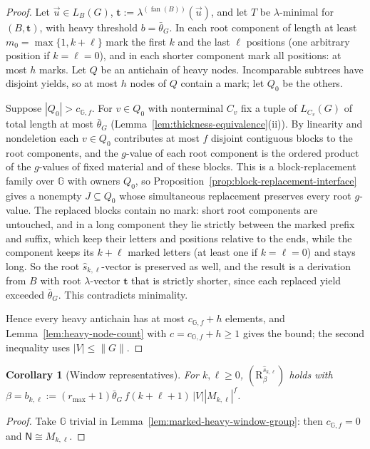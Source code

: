 \documentclass[11pt]{article}
\numberwithin{equation}{section}
\theoremstyle{plain}
\newtheorem{corollary}[theorem]{Corollary}
\theoremstyle{definition}
\theoremstyle{remark}
\newcommand{\tuple}[1]{\vec{#1}}
\newcommand{\fan}{\operatorname{fan}}
\begin{document}
\begin{proof}
Let $\tuple u\in L_B(G)$, $\mathbf t:=\lambda^{(\fan(B))}(\tuple u)$, and let $T$ be
$\lambda$-minimal for $(B,\mathbf t)$, with heavy threshold $b=\bar\theta_G$.  In
each root component of length at least $m_0=\max\{1,k+\ell\}$ mark the first $k$
and the last $\ell$ positions (one arbitrary position if $k=\ell=0$), and in each
shorter component mark all positions: at most $h$ marks.  Let $Q$ be an antichain
of heavy nodes.  Incomparable subtrees have disjoint yields, so at most $h$ nodes
of $Q$ contain a mark; let $Q_0$ be the others.

Suppose $|Q_0|>c_{{\mathbb G},f}$.  For $v\in Q_0$ with nonterminal $C_v$ fix a tuple of
$L_{C_v}(G)$ of total length at most $\bar\theta_G$
(Lemma~\ref{lem:thickness-equivalence}(ii)).  By linearity and nondeletion each
$v\in Q_0$ contributes at most $f$ disjoint contiguous blocks to the root
components, and the $g$-value of each root component is the ordered product of
the $g$-values of fixed material and of these blocks.  This is a
block-replacement family over ${\mathbb G}$ with owners $Q_0$, so
Proposition~\ref{prop:block-replacement-interface} gives a nonempty
$J\subseteq Q_0$ whose simultaneous replacement preserves every root $g$-value.
The replaced blocks contain no mark: short root components are untouched, and in
a long component they lie strictly between the marked prefix and suffix, which
keep their letters and positions relative to the ends, while the component keeps
its $k+\ell$ marked letters (at least one if $k=\ell=0$) and stays long.  So the
root $\widehat s_{k,\ell}$-vector is preserved as well, and the result is a derivation
from $B$ with root $\lambda$-vector $\mathbf t$ that is strictly shorter, since each
replaced yield exceeded $\bar\theta_G$.  This contradicts minimality.

Hence every heavy antichain has at most $c_{{\mathbb G},f}+h$ elements, and
Lemma~\ref{lem:heavy-node-count} with $c=c_{{\mathbb G},f}+h\ge1$ gives the bound; the
second inequality uses $|V|\le\|G\|$.
\end{proof}

\begin{corollary}[Window representatives]
\label{lem:boundary-short-canonical}
For $k,\ell\ge0$, $(\mathrm R_\beta^{\widehat s_{k,\ell}})$ holds with
$\beta=b_{k,\ell}:=(r_{\max}+1)\bar\theta_G\,f(k+\ell+1)\,|V||M_{k,\ell}|^f$.
\end{corollary}

\begin{proof}
Take ${\mathbb G}$ trivial in Lemma~\ref{lem:marked-heavy-window-group}: then $c_{{\mathbb G},f}=0$
and $\mathsf N\cong M_{k,\ell}$.
\end{proof}
\end{document}
